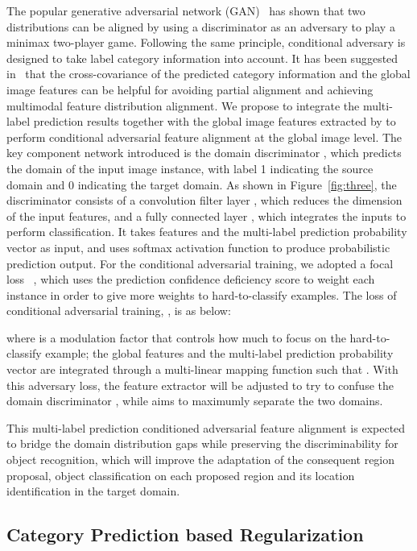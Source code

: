 \documentclass[runningheads]{llncs}
\begin{document}
The popular generative adversarial network (GAN)~\cite{goodfellow2014generative} has shown that 
two distributions can be aligned by using a discriminator as an adversary to play a minimax two-player game. 
Following the same principle, conditional adversary is designed to 
take label category information into account. 
It has been suggested in~\cite{long2018conditional,mirza2014conditional} 
that the cross-covariance of the predicted category information and the global image features 
can be helpful for avoiding partial alignment and achieving multimodal feature distribution alignment.
We propose to integrate the multi-label prediction results
together with the global image features extracted by  to perform conditional adversarial
feature alignment at the global image level.
The key component network introduced is the domain discriminator ,
which predicts the domain of the input image instance,
with label 1 indicating the source domain and 0 indicating the target domain.
As shown in Figure~\ref{fig:three}, the discriminator 
consists of a convolution filter layer , which reduces the dimension of the input features, 
and a fully connected layer , which integrates the inputs to perform classification.
It takes features  and the multi-label prediction probability vector  as input,
and uses softmax activation function to produce probabilistic prediction output. 
For the conditional adversarial training, we adopted a focal loss
~\cite{lin2017focal,saito2019strong}, which uses the prediction confidence deficiency score to weight 
each instance in order to give more weights to hard-to-classify examples. 
The loss of conditional adversarial training, , is as below:

where  is a modulation factor that controls how much to focus on the hard-to-classify example;
the global features  and the multi-label prediction probability vector  are
integrated through a multi-linear mapping function such that
. 
With this adversary loss, 
the feature extractor  will be adjusted to try to confuse the domain 
discriminator , while  aims to maximumly separate the two domains. 


This multi-label prediction conditioned adversarial feature alignment 
is expected to bridge the domain distribution gaps while preserving the discriminability for object recognition,
which will improve 
the adaptation of 
the consequent region proposal, 
object classification on each proposed region and its location identification in the target domain. 

\subsection{Category Prediction based Regularization}
\label{3.3}
\end{document}
